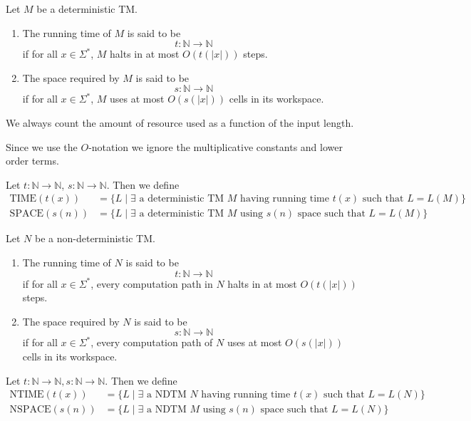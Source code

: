 \documentclass{article}
\begin{document}
Let $M$ be a deterministic TM. 
\begin{enumerate}
\item\label{item:56} The running time of $M$ is said to be 
\begin{displaymath}
t: \mathbb{N} \to \mathbb{N}
\end{displaymath}
if for all $x \in \Sigma^{*}$, $M$ halts in at most $O(t(|x|))$ steps. 
\item\label{item:57} The space required by $M$ is said to be 
\begin{displaymath}
s: \mathbb{N} \to \mathbb{N}
\end{displaymath}
if for all $x\in \Sigma^{*}$, $M$ uses at most $O(s(|x|))$ cells in its workspace.
\end{enumerate}

We always count the amount of resource used as a function of the input length.

Since we use the $O$-notation we ignore the multiplicative constants and lower order terms.

Let $t : \mathbb{N} \to \mathbb{N}$, $s: \mathbb{N} \to \mathbb{N}$. Then we define 
\begin{align*}
  \text{TIME}(t(x)) &= \{ L \mid \exists \text{ a deterministic TM $M$ having running time } t(x) \text{ such that } L=L(M) \} \\
  \text{SPACE}(s(n)) &= \{ L \mid \exists \text{ a deterministic TM $M$ using $s(n)$ space such that } L = L(M) \}
\end{align*}

Let $N$ be a non-deterministic TM.

\begin{enumerate}
\item\label{item:56} The running time of $N$ is said to be 
\begin{displaymath}
t: \mathbb{N} \to \mathbb{N}
\end{displaymath}
if for all $x \in \Sigma^{*}$, every computation path in $N$ halts in at most $O(t(|x|))$ steps. 
\item\label{item:57} The space required by $N$ is said to be 
\begin{displaymath}
s: \mathbb{N} \to \mathbb{N}
\end{displaymath}
if for all $x\in \Sigma^{*}$, every computation path of $N$ uses at most $O(s(|x|))$ cells in its workspace.
\end{enumerate}

Let $t : \mathbb{N} \to \mathbb{N}, s: \mathbb{N} \to \mathbb{N}$. Then we define 
\begin{align*}
  \text{NTIME}(t(x)) &= \{ L \mid \exists \text{ a NDTM $N$ having running time } t(x) \text{ such that } L=L(N) \} \\
  \text{NSPACE}(s(n)) &= \{ L \mid \exists \text{ a NDTM $M$ using $s(n)$ space such that } L = L(N) \}
\end{align*}
\end{document}
